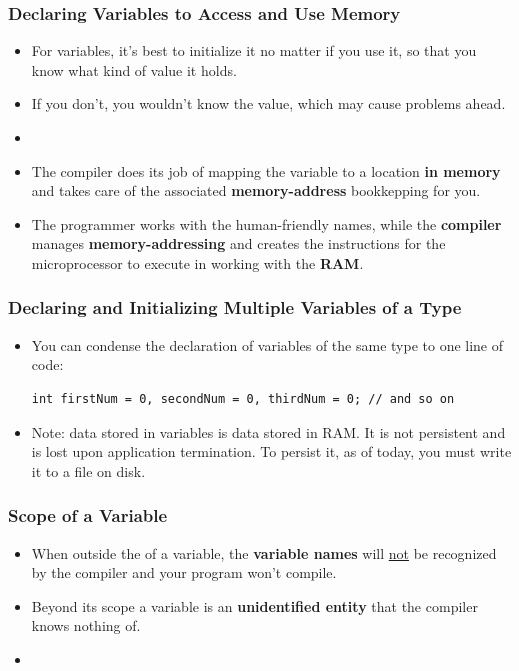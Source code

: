 \documentclass[10pt]{article}
\newcommand{\vocab}[1]{\fbox{\textbf{\textit{#1}}}}
\begin{document}
\subsubsection{Declaring Variables to Access and Use Memory}
\begin{itemize}
 \item For variables, it's best to initialize it no matter if you use it, so that you know what kind of value it holds. 
	\item If you don't, you wouldn't know the value, which may cause problems ahead.
	\item {}

	\item The compiler does its job of mapping the variable to a location \textbf{in memory} and takes care of the associated \textbf{memory-address} bookkepping for you.
	\item The programmer works with the human-friendly names, while the \textbf{compiler} manages \textbf{memory-addressing} and creates the instructions for the microprocessor to execute in working with the \textbf{RAM}.
\end{itemize}

\newpage

\subsubsection{Declaring and Initializing Multiple Variables of a Type}
\begin{itemize}
	\item You can condense the declaration of variables of the same type to one line of code:
		\begin{verbatim}
int firstNum = 0, secondNum = 0, thirdNum = 0; // and so on
		\end{verbatim}

	\item Note: data stored in variables is data stored in RAM. It is not persistent and is lost upon application termination. To persist it, as of today, you must write it to a file on disk.
\end{itemize}

\newpage

\subsubsection{Scope of a Variable}
\begin{itemize}

	\item When outside the \vocab{scope} of a variable, the \textbf{variable names} will \underline{not} be recognized by the compiler and your program won't compile.
\item Beyond its scope a variable is an \textbf{unidentified entity} that the compiler knows nothing of.

\item {}
\end{itemize}
\end{document}
